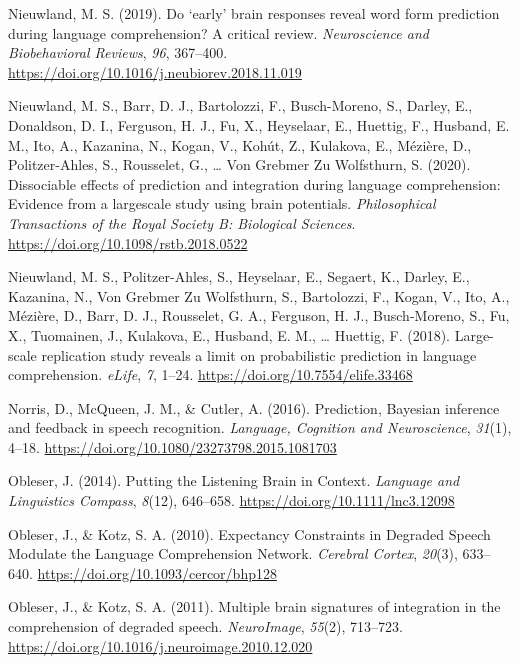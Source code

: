 \documentclass[a4paper, nobind]{templates/ociamthesis}
\newlength{\cslhangindent}
\newenvironment{CSLReferences}[2] %
 {%
  \setlength{\parindent}{0pt}
  \ifodd #1
  \let\oldpar\par
  \def\par{\hangindent=\cslhangindent\oldpar}
  \fi
  \setlength{\parskip}{1mm}
  \setlength{\baselineskip}{6mm}
 }%
 {}
\begin{document}
\begin{CSLReferences}{1}{0}
\leavevmode{}%
Nieuwland, M. S. (2019). {Do `early' brain responses reveal word form prediction during language comprehension? A critical review}. \emph{Neuroscience and Biobehavioral Reviews}, \emph{96}, 367--400. \url{https://doi.org/10.1016/j.neubiorev.2018.11.019}

\leavevmode{}%
Nieuwland, M. S., Barr, D. J., Bartolozzi, F., Busch-Moreno, S., Darley, E., Donaldson, D. I., Ferguson, H. J., Fu, X., Heyselaar, E., Huettig, F., Husband, E. M., Ito, A., Kazanina, N., Kogan, V., Kohút, Z., Kulakova, E., Mézière, D., Politzer-Ahles, S., Rousselet, G., \ldots{} Von Grebmer Zu Wolfsthurn, S. (2020). {Dissociable effects of prediction and integration during language comprehension: Evidence from a largescale study using brain potentials}. \emph{Philosophical Transactions of the Royal Society B: Biological Sciences}. \url{https://doi.org/10.1098/rstb.2018.0522}

\leavevmode{}%
Nieuwland, M. S., Politzer-Ahles, S., Heyselaar, E., Segaert, K., Darley, E., Kazanina, N., Von Grebmer Zu Wolfsthurn, S., Bartolozzi, F., Kogan, V., Ito, A., Mézière, D., Barr, D. J., Rousselet, G. A., Ferguson, H. J., Busch-Moreno, S., Fu, X., Tuomainen, J., Kulakova, E., Husband, E. M., \ldots{} Huettig, F. (2018). {Large-scale replication study reveals a limit on probabilistic prediction in language comprehension}. \emph{eLife}, \emph{7}, 1--24. \url{https://doi.org/10.7554/elife.33468}

\leavevmode{}%
Norris, D., McQueen, J. M., \& Cutler, A. (2016). {Prediction, Bayesian inference and feedback in speech recognition}. \emph{Language, Cognition and Neuroscience}, \emph{31}(1), 4--18. \url{https://doi.org/10.1080/23273798.2015.1081703}

\leavevmode{}%
Obleser, J. (2014). Putting the Listening Brain in Context. \emph{Language and Linguistics Compass}, \emph{8}(12), 646--658. \url{https://doi.org/10.1111/lnc3.12098}

\leavevmode{}%
Obleser, J., \& Kotz, S. A. (2010). Expectancy Constraints in Degraded Speech Modulate the Language Comprehension Network. \emph{Cerebral Cortex}, \emph{20}(3), 633--640. \url{https://doi.org/10.1093/cercor/bhp128}

\leavevmode{}%
Obleser, J., \& Kotz, S. A. (2011). Multiple brain signatures of integration in the comprehension of degraded speech. \emph{NeuroImage}, \emph{55}(2), 713--723. \url{https://doi.org/10.1016/j.neuroimage.2010.12.020}


\end{CSLReferences}
\end{document}
